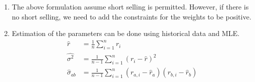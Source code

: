 \documentclass[12pt,twoside]{article}
\begin{document}
\begin{enumerate}
	\item The above formulation assume short selling is permitted. However, if there is no short selling, we need to add the constraints for the weights to be positive.
	
	\item Estimation of the parameters can be done using historical data and MLE.
		\begin{align*}
			\hat{r} 				& = \frac{1}{n}\sum_{i=1}^n r_i\\
			\hat{\sigma^2}	& = \frac{1}{n-1}\sum_{i=1}^n (r_i-\hat{r})^2\\
			\hat{\sigma}_{ab}& = \frac{1}{n-1} \sum_{i=1}^n (r_{a,i}-\hat{r}_a)(r_{b,i}-\hat{r}_b)
		\end{align*}

\end{enumerate}
\end{document}
